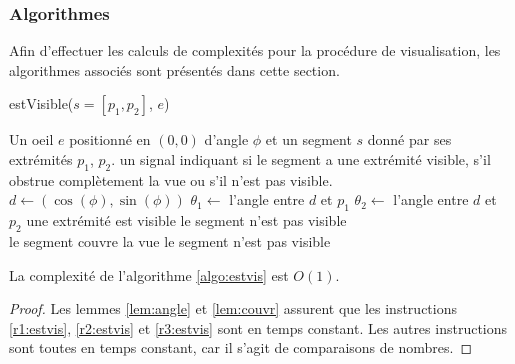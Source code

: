 \subsubsection*{Algorithmes}

Afin d'effectuer les calculs de complexités pour la procédure
de visualisation, les algorithmes associés sont présentés
dans cette section.

\begin{algorithm}
  \caption{estVisible($s=[p_1, p_2]$, $e$)}\label{algo:estvis}
  \begin{algorithmic}[1]
    \REQUIRE Un oeil $e$ positionné en $(0, 0)$ d'angle $\phi$ et un segment $s$
    donné par ses extrémités $p_1$, $p_2$.
    \ENSURE un signal indiquant si le segment a une extrémité visible,
    s'il obstrue complètement la vue ou s'il n'est pas visible.
    \STATE $d\leftarrow (\cos(\phi), \sin(\phi))$
    \STATE $\theta_1\leftarrow$ l'angle entre $d$ et $p_1$ \label{r1:estvis}
    \STATE $\theta_2\leftarrow$ l'angle entre $d$ et $p_2$ \label{r2:estvis}
    \IF{$\theta_1\in[-\pi/4, \pi/4]\lor \theta_2\in[-\pi/4, \pi/4]$}
    \RETURN \og{}une extrémité est visible\fg{}
    \RETURN \og le segment n'est pas visible \fg \\
     \label{r3:estvis}
    \RETURN \og le segment couvre la vue\fg
    \ELSE
    \RETURN \og le segment n'est pas visible \fg
    \ENDIF
  \end{algorithmic}
\end{algorithm}

\begin{prop}
  La complexité de l'algorithme \ref{algo:estvis} est $O(1)$.
\end{prop}
\begin{proof}
  Les lemmes \ref{lem:angle} et \ref{lem:couvr} assurent que
  les instructions \ref{r1:estvis}, \ref{r2:estvis} et \ref{r3:estvis} sont en temps
  constant. Les autres instructions sont toutes en temps constant, car il s'agit
  de comparaisons de nombres.
\end{proof}

